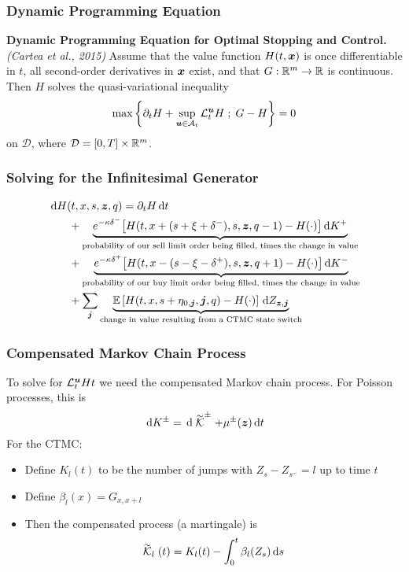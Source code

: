 \begin{frame}
\frametitle{Dynamic Programming Equation}
\begin{theorem}{\bf Dynamic Programming Equation for Optimal Stopping and Control.} \textit{(Cartea et al., 2015)} Assume that the value function $H(t,\bm{x})$ is once differentiable in $t$, all second-order derivatives in $\bm{x}$ exist, and that $G : \mathbb{R}^m \rightarrow \mathbb{R}$ is continuous. Then $H$ solves the quasi-variational inequality
\[
\max \left\lbrace \partial_t H + \sup \limits_{\bm{u} \in \mathcal{A}_t} \mathcal{L}^{\bm{u}}_t H \; ; \; G - H \right\rbrace = 0
\]
on $\mathcal{D}$, where $\mathcal{D} = [0,T] \times \mathbb{R}^m$.
\end{theorem}
\end{frame}

\begin{frame}
\frametitle{Solving for the Infinitesimal Generator}
\[
\begin{aligned}
& \,\mathrm{d} H (t,x,s,\bm{z},q) = \partial_t H \,\mathrm{d} t \\
& \hphantom{\partial_t H} + \underbrace{e^{ -\kappa \delta^{-}} \bigl[ H(t,x+(s+\xi+\delta^-),s,\bm{z},q-1) - H(\cdot) \bigr] \,\mathrm{d} K^+}_{\text{probability of our sell limit order being filled, times the change in value}} \\
& \hphantom{\partial_t H} + \underbrace{e^{ -\kappa \delta^{+}} \bigl[ H(t,x-(s-\xi-\delta^+),s,\bm{z},q+1) - H(\cdot) \bigr] \,\mathrm{d} K^-}_{\text{probability of our buy limit order being filled, times the change in value}} \\
& \hphantom{\partial_t H} + \sum_{\bm{j}} \underbrace{\mathbb{E} \left[ H(t,x,s+\eta_{0,\bm{j}},\bm{j},q) - H(\cdot) \right] \,\mathrm{d} Z_{\bm{z},\bm{j}}}_{\text{change in value resulting from a CTMC state switch}}
\end{aligned}
\]
\end{frame}

\begin{frame}
\frametitle{Compensated Markov Chain Process}
To solve for $\mathcal{L}^{\bm{u}}_t Ht$ we need the compensated Markov chain process.
For Poisson processes, this is
\[ \d K^{\pm} = \d \simcal{K}^{\pm} + \mu^{\pm}(\bz) \d t \]
For the CTMC:
\begin{itemize}
\item Define $K_l(t)$ to be the number of jumps with $Z_s - Z_{s^-} = l$ up to time $t$ 
\item Define $\beta_l(x) = G_{x,x+l}$
\item Then the compensated process (a martingale) is \[ \simcal{K}_l(t) = K_l(t) - \int_0^t \beta_l(Z_s) \d s \]
\end{itemize}
\end{frame}

